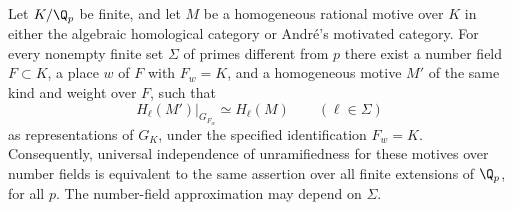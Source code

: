 \begin{proposition}
\label{c:local-global-motive-approximation}
Let $K/\Q_p$ be finite, and let $M$ be a homogeneous rational
motive over $K$ in either the algebraic homological category or
Andr\'e's motivated category.
For every nonempty finite set $\Sigma$ of primes different from $p$
there exist a number field $F\subset K$, a place $w$ of $F$ with
$F_w=K$, and a homogeneous motive $M'$ of the same kind and weight
over $F$, such that
\[
 H_\ell(M')|_{G_{F_w}}\simeq H_\ell(M)
 \qquad(\ell\in\Sigma)
\]
as representations of $G_K$, under the specified identification
$F_w=K$.
Consequently, universal independence of unramifiedness for these
motives over number fields is equivalent to the same assertion over
all finite extensions of $\Q_p$, for all $p$.
The number-field approximation may depend on $\Sigma$.
\end{proposition}


